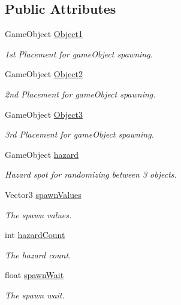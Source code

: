 \subsection*{Public Attributes}
\begin{DoxyCompactItemize}
\item 
Game\-Object \hyperlink{classGameController_ae2d31db5ff00946e41b2dcd7ddda941a}{Object1}
\begin{DoxyCompactList}\small\item\em 1st Placement for game\-Object spawning. \end{DoxyCompactList}\item 
Game\-Object \hyperlink{classGameController_ab5c9311e9997c3d8a34833b3760f28f8}{Object2}
\begin{DoxyCompactList}\small\item\em 2nd Placement for game\-Object spawning. \end{DoxyCompactList}\item 
Game\-Object \hyperlink{classGameController_a9956f5a361f097e051a144a2b787e5ca}{Object3}
\begin{DoxyCompactList}\small\item\em 3rd Placement for game\-Object spawning. \end{DoxyCompactList}\item 
Game\-Object \hyperlink{classGameController_a77c185a594a084fe342e8de517808654}{hazard}
\begin{DoxyCompactList}\small\item\em Hazard spot for randomizing between 3 objects. \end{DoxyCompactList}\item 
Vector3 \hyperlink{classGameController_a5e4f56c23896d4b528da579f93335896}{spawn\-Values}
\begin{DoxyCompactList}\small\item\em The spawn values. \end{DoxyCompactList}\item 
int \hyperlink{classGameController_a973f0e7d25e3b260cf0aa51730584ada}{hazard\-Count}
\begin{DoxyCompactList}\small\item\em The hazard count. \end{DoxyCompactList}\item 
float \hyperlink{classGameController_a27c91a14de3982813ad3d8245d0134d7}{spawn\-Wait}
\begin{DoxyCompactList}\small\item\em The spawn wait. \end{DoxyCompactList}\item 

\end{DoxyCompactItemize}
